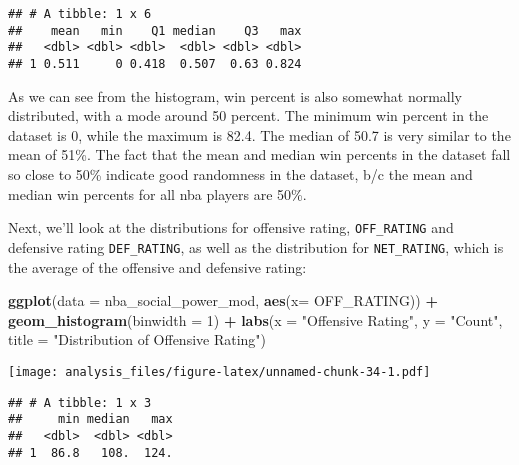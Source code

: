 \documentclass[]{article}
\newenvironment{Shaded}{\begin{snugshade}}{\end{snugshade}}
\newcommand{\DataTypeTok}[1]{\textcolor[rgb]{0.13,0.29,0.53}{#1}}
\newcommand{\DecValTok}[1]{\textcolor[rgb]{0.00,0.00,0.81}{#1}}
\newcommand{\KeywordTok}[1]{\textcolor[rgb]{0.13,0.29,0.53}{\textbf{#1}}}
\newcommand{\NormalTok}[1]{#1}
\newcommand{\OperatorTok}[1]{\textcolor[rgb]{0.81,0.36,0.00}{\textbf{#1}}}
\newcommand{\StringTok}[1]{\textcolor[rgb]{0.31,0.60,0.02}{#1}}
\begin{document}
\begin{verbatim}
## # A tibble: 1 x 6
##    mean   min    Q1 median    Q3   max
##   <dbl> <dbl> <dbl>  <dbl> <dbl> <dbl>
## 1 0.511     0 0.418  0.507  0.63 0.824
\end{verbatim}

As we can see from the histogram, win percent is also somewhat normally
distributed, with a mode around 50 percent. The minimum win percent in
the dataset is 0, while the maximum is 82.4. The median of 50.7 is very
similar to the mean of 51\%. The fact that the mean and median win
percents in the dataset fall so close to 50\% indicate good randomness
in the dataset, b/c the mean and median win percents for all nba players
are 50\%.

Next, we'll look at the distributions for offensive rating,
\texttt{OFF\_RATING} and defensive rating \texttt{DEF\_RATING}, as well
as the distribution for \texttt{NET\_RATING}, which is the average of
the offensive and defensive rating:

\begin{Shaded}
\begin{Highlighting}[]
\KeywordTok{ggplot}\NormalTok{(}\DataTypeTok{data =}\NormalTok{ nba_social_power_mod, }\KeywordTok{aes}\NormalTok{(}\DataTypeTok{x=}\NormalTok{ OFF_RATING)) }\OperatorTok{+}\StringTok{ }
\StringTok{  }\KeywordTok{geom_histogram}\NormalTok{(}\DataTypeTok{binwidth =} \DecValTok{1}\NormalTok{) }\OperatorTok{+}
\StringTok{  }\KeywordTok{labs}\NormalTok{(}\DataTypeTok{x =} \StringTok{"Offensive Rating"}\NormalTok{, }\DataTypeTok{y =} \StringTok{"Count"}\NormalTok{,}
       \DataTypeTok{title =} \StringTok{"Distribution of Offensive Rating"}\NormalTok{)}
\end{Highlighting}
\end{Shaded}

\texttt{[image: analysis\_files/figure-latex/unnamed-chunk-34-1.pdf]}

\begin{Shaded}
\end{Shaded}

\begin{verbatim}
## # A tibble: 1 x 3
##     min median   max
##   <dbl>  <dbl> <dbl>
## 1  86.8   108.  124.
\end{verbatim}
\end{document}
